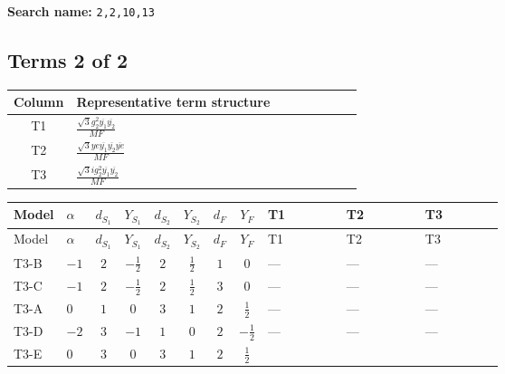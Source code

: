 \documentclass[8pt]{article}
\begin{document}
\begin{landscape}
\begin{longtable}{@{}llcccccc >{\raggedright\arraybackslash}p{0.21\linewidth} >{\raggedright\arraybackslash}p{0.21\linewidth} >{\raggedright\arraybackslash}p{0.21\linewidth}@{}}
\midrule
\bottomrule
\end{longtable}
\clearpage
\noindent\textbf{Search name: }\texttt{2,2,10,13}\par\smallskip
\subsection*{Terms 2 of 2}
\begin{center}
\begin{tabular}{@{}c >{\raggedright\arraybackslash}p{0.82\linewidth}@{}}
\toprule
Column & Representative term structure \\
\midrule
T1 & \(\displaystyle \frac{\sqrt{3} g_{2}^{2} \overline{y_{1}} \overline{y_{2}}}{MF}\) \\
\midrule
T2 & \(\displaystyle \frac{\sqrt{3} ye \overline{y_{1}} \overline{y_{2}} \overline{ye}}{MF}\) \\
\midrule
T3 & \(\displaystyle \frac{\sqrt{3} i g_{2}^{2} \overline{y_{1}} \overline{y_{2}}}{MF}\) \\
\midrule
\bottomrule
\end{tabular}
\end{center}
\smallskip
\tiny
\begin{longtable}{@{}llcccccc >{\raggedright\arraybackslash}p{0.21\linewidth} >{\raggedright\arraybackslash}p{0.21\linewidth} >{\raggedright\arraybackslash}p{0.21\linewidth}@{}}
\toprule
Model & $\alpha$ & $d_{S_1}$ & $Y_{S_1}$ & $d_{S_2}$ & $Y_{S_2}$ & $d_F$ & $Y_F$ & T1 & T2 & T3 \\
\midrule
\endfirsthead
\toprule
Model & $\alpha$ & $d_{S_1}$ & $Y_{S_1}$ & $d_{S_2}$ & $Y_{S_2}$ & $d_F$ & $Y_F$ & T1 & T2 & T3 \\
\midrule
\endhead
T3-B & $-1$ & $2$ & $-\frac{1}{2}$ & $2$ & $\frac{1}{2}$ & $1$ & $0$ & --- & --- & --- \\
\midrule
T3-C & $-1$ & $2$ & $-\frac{1}{2}$ & $2$ & $\frac{1}{2}$ & $3$ & $0$ & --- & --- & --- \\
\midrule
T3-A & $0$ & $1$ & $0$ & $3$ & $1$ & $2$ & $\frac{1}{2}$ & --- & --- & --- \\
\midrule
T3-D & $-2$ & $3$ & $-1$ & $1$ & $0$ & $2$ & $-\frac{1}{2}$ & --- & --- & --- \\
\midrule
T3-E & $0$ & $3$ & $0$ & $3$ & $1$ & $2$ & $\frac{1}{2}$ & \scriptsize\adjustbox{max width=\linewidth}{$\begin{gathered} \frac{11 \sqrt{3} g_{2}^{2} \overline{y_{1}} \overline{y_{2}}}{8 MF}\end{gathered}$} & \scriptsize\adjustbox{max width=\linewidth}{$\begin{gathered} - \frac{\sqrt{3} ye \overline{y_{1}} \overline{y_{2}} \overline{ye}}{12 MF}\end{gathered}$} & \scriptsize\adjustbox{max width=\linewidth}{$\begin{gathered} \frac{\sqrt{3} i g_{2}^{2} \overline{y_{1}} \overline{y_{2}}}{6 MF}\end{gathered}$} \\
\midrule
\bottomrule
\end{longtable}
\clearpage

\end{landscape}
\end{document}
